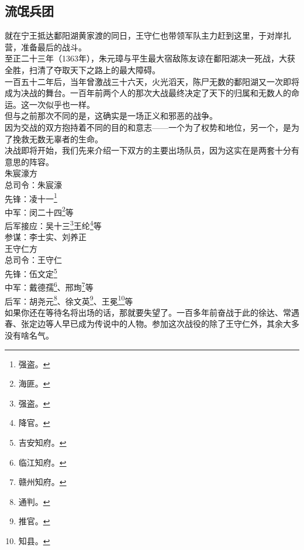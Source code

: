 \begin{multicols}{\theparacolNo}
\subsection{流氓兵团}
就在宁王抵达鄱阳湖黄家渡的同日，王守仁也带领军队主力赶到这里，于对岸扎营，准备最后的战斗。\\

至正二十三年（1363年），朱元璋与平生最大宿敌陈友谅在鄱阳湖决一死战，大获全胜，扫清了夺取天下之路上的最大障碍。\\

一百五十二年后，当年曾激战三十六天，火光滔天，陈尸无数的鄱阳湖又一次即将成为决战的舞台。一百年前两个人的那次大战最终决定了天下的归属和无数人的命运。这一次似乎也一样。\\

但与之前那次不同的是，这确实是一场正义和邪恶的战争。\\

因为交战的双方抱持着不同的目的和意志——一个为了权势和地位，另一个，是为了挽救无数无辜者的生命。\\

决战即将开始，我们先来介绍一下双方的主要出场队员，因为这实在是两套十分有意思的阵容。\\

朱宸濠方\\

总司令：朱宸濠\\

先锋：凌十一\footnote{强盗。}\\

中军：闵二十四\footnote{海匪。}等\\

后军接应：吴十三\footnote{强盗。}王纶\footnote{降官。}等\\

参谋：李士实、刘养正\\

王守仁方\\

总司令：王守仁\\

先锋：伍文定\footnote{吉安知府。}\\

中军：戴德孺\footnote{临江知府。}、邢珣\footnote{赣州知府。}等\\

后军：胡尧元\footnote{通判。}、徐文英\footnote{推官。}、王冕\footnote{知县。}等\\

如果你还在等待名将出场的话，那就要失望了。一百多年前奋战于此的徐达、常遇春、张定边等人早已成为传说中的人物。参加这次战役的除了王守仁外，其余大多没有啥名气。\\


\end{multicols}
